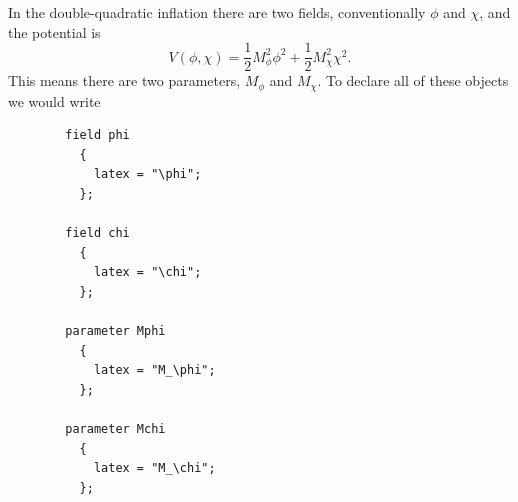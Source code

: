 \documentclass[11pt,a4paper]{article}
\newenvironment{example}{\begin{tcolorbox}[enhanced,breakable,colback=black!10,colbacktitle=black!20,colframe=black!40,coltitle=black,title=Example,fonttitle=\sffamily\fontseries{b}\selectfont]}{\end{tcolorbox}}
\begin{document}
\begin{example}
    In the double-quadratic inflation there are two
    fields, conventionally $\phi$ and $\chi$,
    and the potential is
    \begin{equation}
        V(\phi, \chi) = \frac{1}{2} M_\phi^2 \phi^2
            + \frac{1}{2} M_\chi^2 \chi^2 .
        \label{eq:double-quadratic-V}
    \end{equation}
    This means there are two parameters, $M_\phi$
    and $M_\chi$.
    To declare all of these objects we would write
    \begin{verbatim}
        field phi
          {
            latex = "\phi";
          };
        
        field chi
          {
            latex = "\chi";
          };
        
        parameter Mphi
          {
            latex = "M_\phi";
          };
        
        parameter Mchi
          {
            latex = "M_\chi";
          };    
    \end{verbatim}
\end{example}
\end{document}
